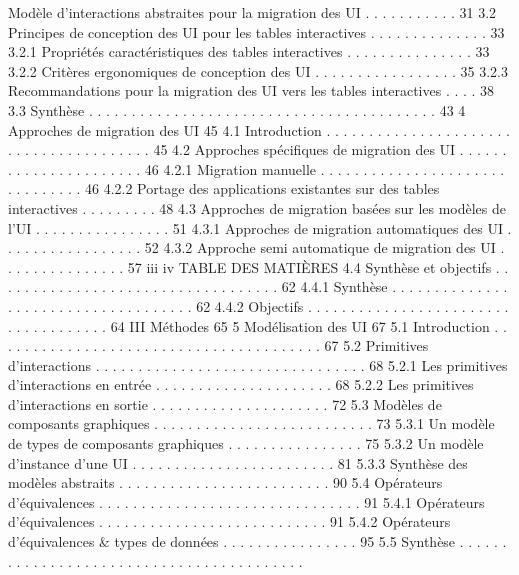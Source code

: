 \documentclass{article}
\begin{document}
Modèle d’interactions abstraites pour la migration des UI . . . . . . . . . . .
31
3.2
Principes de conception des UI pour les tables interactives
. . . . . . . . . . . . . .
33
3.2.1
Propriétés caractéristiques des tables interactives . . . . . . . . . . . . . . .
33
3.2.2
Critères ergonomiques de conception des UI
. . . . . . . . . . . . . . . . .
35
3.2.3
Recommandations pour la migration des UI vers les tables interactives . . . .
38
3.3
Synthèse . . . . . . . . . . . . . . . . . . . . . . . . . . . . . . . . . . . . . . . . .
43
4
Approches de migration des UI
45
4.1
Introduction . . . . . . . . . . . . . . . . . . . . . . . . . . . . . . . . . . . . . . .
45
4.2
Approches spéciﬁques de migration des UI
. . . . . . . . . . . . . . . . . . . . . .
46
4.2.1
Migration manuelle . . . . . . . . . . . . . . . . . . . . . . . . . . . . . . .
46
4.2.2
Portage des applications existantes sur des tables interactives . . . . . . . . .
48
4.3
Approches de migration basées sur les modèles de l’UI . . . . . . . . . . . . . . . .
51
4.3.1
Approches de migration automatiques des UI . . . . . . . . . . . . . . . . .
52
4.3.2
Approche semi automatique de migration des UI . . . . . . . . . . . . . . .
57
iii
iv
TABLE DES MATIÈRES
4.4
Synthèse et objectifs
. . . . . . . . . . . . . . . . . . . . . . . . . . . . . . . . . .
62
4.4.1
Synthèse
. . . . . . . . . . . . . . . . . . . . . . . . . . . . . . . . . . . .
62
4.4.2
Objectifs
. . . . . . . . . . . . . . . . . . . . . . . . . . . . . . . . . . . .
64
III
Méthodes
65
5
Modélisation des UI
67
5.1
Introduction . . . . . . . . . . . . . . . . . . . . . . . . . . . . . . . . . . . . . . .
67
5.2
Primitives d’interactions
. . . . . . . . . . . . . . . . . . . . . . . . . . . . . . . .
68
5.2.1
Les primitives d’interactions en entrée . . . . . . . . . . . . . . . . . . . . .
68
5.2.2
Les primitives d’interactions en sortie . . . . . . . . . . . . . . . . . . . . .
72
5.3
Modèles de composants graphiques
. . . . . . . . . . . . . . . . . . . . . . . . . .
73
5.3.1
Un modèle de types de composants graphiques . . . . . . . . . . . . . . . .
75
5.3.2
Un modèle d’instance d’une UI
. . . . . . . . . . . . . . . . . . . . . . . .
81
5.3.3
Synthèse des modèles abstraits . . . . . . . . . . . . . . . . . . . . . . . . .
90
5.4
Opérateurs d’équivalences
. . . . . . . . . . . . . . . . . . . . . . . . . . . . . . .
91
5.4.1
Opérateurs d’équivalences . . . . . . . . . . . . . . . . . . . . . . . . . . .
91
5.4.2
Opérateurs d’équivalences & types de données
. . . . . . . . . . . . . . . .
95
5.5
Synthèse . . . . . . . . . . . . . . . . . . . . . . . . . . . . . . . . . . . . . . . . .
\end{document}
